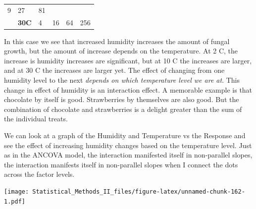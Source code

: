 \documentclass[]{book}
\theoremstyle{definition}
\theoremstyle{definition}
\theoremstyle{remark}
\begin{document}
\begin{longtable}[]{@{}llllll@{}}
\begin{minipage}[t]{0.07\columnwidth}
9\strut
\end{minipage} & \begin{minipage}[t]{0.07\columnwidth}\raggedright\strut
27\strut
\end{minipage} & \begin{minipage}[t]{0.07\columnwidth}\raggedright\strut
81\strut
\end{minipage}\tabularnewline
\begin{minipage}[t]{0.20\columnwidth}\raggedright\strut
\strut
\end{minipage} & \begin{minipage}[t]{0.12\columnwidth}\raggedright\strut
\textbf{30C}\strut
\end{minipage} & \begin{minipage}[t]{0.07\columnwidth}\raggedright\strut
4\strut
\end{minipage} & \begin{minipage}[t]{0.07\columnwidth}\raggedright\strut
16\strut
\end{minipage} & \begin{minipage}[t]{0.07\columnwidth}\raggedright\strut
64\strut
\end{minipage} & \begin{minipage}[t]{0.07\columnwidth}\raggedright\strut
256\strut
\end{minipage}\tabularnewline
\bottomrule
\end{longtable}

In this case we see that increased humidity increases the amount of
fungal growth, but the amount of increase depends on the temperature. At
2 C, the increase is humidity increases are significant, but at 10 C the
increases are larger, and at 30 C the increases are larger yet. The
effect of changing from one humidity level to the next \emph{depends on
which temperature level we are at}. This change in effect of humidity is
an interaction effect. A memorable example is that chocolate by itself
is good. Strawberries by themselves are also good. But the combination
of chocolate and strawberries is a delight greater than the sum of the
individual treats.

We can look at a graph of the Humidity and Temperature vs the Response
and see the effect of increasing humidity changes based on the
temperature level. Just as in the ANCOVA model, the interaction
manifested itself in non-parallel slopes, the interaction manifests
itself in non-parallel slopes when I connect the dots across the factor
levels.

\texttt{[image: Statistical\_Methods\_II\_files/figure-latex/unnamed-chunk-162-1.pdf]}
\end{document}
